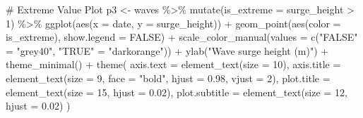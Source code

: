 \documentclass[
  letterpaper,
  DIV=11,
  numbers=noendperiod]{scrreprt}
\newenvironment{Shaded}{\begin{snugshade}}{\end{snugshade}}
\newcommand{\AttributeTok}[1]{\textcolor[rgb]{0.40,0.45,0.13}{#1}}
\newcommand{\CommentTok}[1]{\textcolor[rgb]{0.37,0.37,0.37}{#1}}
\newcommand{\ConstantTok}[1]{\textcolor[rgb]{0.56,0.35,0.01}{#1}}
\newcommand{\DecValTok}[1]{\textcolor[rgb]{0.68,0.00,0.00}{#1}}
\newcommand{\FloatTok}[1]{\textcolor[rgb]{0.68,0.00,0.00}{#1}}
\newcommand{\FunctionTok}[1]{\textcolor[rgb]{0.28,0.35,0.67}{#1}}
\newcommand{\NormalTok}[1]{\textcolor[rgb]{0.00,0.23,0.31}{#1}}
\newcommand{\OtherTok}[1]{\textcolor[rgb]{0.00,0.23,0.31}{#1}}
\newcommand{\SpecialCharTok}[1]{\textcolor[rgb]{0.37,0.37,0.37}{#1}}
\newcommand{\StringTok}[1]{\textcolor[rgb]{0.13,0.47,0.30}{#1}}
\begin{document}
\begin{Shaded}
\begin{Highlighting}[]
\CommentTok{\# Extreme Value Plot}
\NormalTok{p3 }\OtherTok{\textless{}{-}}\NormalTok{ waves }\SpecialCharTok{\%\textgreater{}\%} 
  \FunctionTok{mutate}\NormalTok{(}\AttributeTok{is\_extreme =}\NormalTok{ surge\_height }\SpecialCharTok{\textgreater{}} \DecValTok{1}\NormalTok{) }\SpecialCharTok{\%\textgreater{}\%}
  \FunctionTok{ggplot}\NormalTok{(}\FunctionTok{aes}\NormalTok{(}\AttributeTok{x =}\NormalTok{ date, }\AttributeTok{y =}\NormalTok{ surge\_height)) }\SpecialCharTok{+}
  \FunctionTok{geom\_point}\NormalTok{(}\FunctionTok{aes}\NormalTok{(}\AttributeTok{color =}\NormalTok{ is\_extreme), }\AttributeTok{show.legend =} \ConstantTok{FALSE}\NormalTok{) }\SpecialCharTok{+} 
  \FunctionTok{scale\_color\_manual}\NormalTok{(}\AttributeTok{values =} \FunctionTok{c}\NormalTok{(}\StringTok{"FALSE"} \OtherTok{=} \StringTok{"grey40"}\NormalTok{, }\StringTok{"TRUE"} \OtherTok{=} \StringTok{"darkorange"}\NormalTok{)) }\SpecialCharTok{+}
  \FunctionTok{ylab}\NormalTok{(}\StringTok{"Wave surge height (m)"}\NormalTok{) }\SpecialCharTok{+}
  \FunctionTok{theme\_minimal}\NormalTok{() }\SpecialCharTok{+}
  \FunctionTok{theme}\NormalTok{(}
    \AttributeTok{axis.text =} \FunctionTok{element\_text}\NormalTok{(}\AttributeTok{size =} \DecValTok{10}\NormalTok{),}
    \AttributeTok{axis.title =} \FunctionTok{element\_text}\NormalTok{(}\AttributeTok{size =} \DecValTok{9}\NormalTok{, }\AttributeTok{face =} \StringTok{"bold"}\NormalTok{,  }\AttributeTok{hjust =} \FloatTok{0.98}\NormalTok{, }\AttributeTok{vjust =} \DecValTok{2}\NormalTok{),}
    \AttributeTok{plot.title =} \FunctionTok{element\_text}\NormalTok{(}\AttributeTok{size =} \DecValTok{15}\NormalTok{, }\AttributeTok{hjust =} \FloatTok{0.02}\NormalTok{),}
    \AttributeTok{plot.subtitle =} \FunctionTok{element\_text}\NormalTok{(}\AttributeTok{size =} \DecValTok{12}\NormalTok{, }\AttributeTok{hjust =} \FloatTok{0.02}\NormalTok{)}
\NormalTok{  )}


\end{Highlighting}
\end{Shaded}
\end{document}
